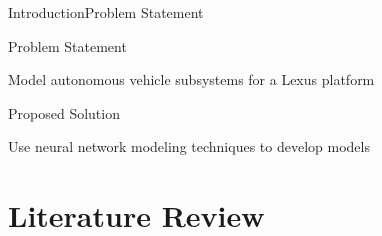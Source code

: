 \documentclass{beamer}
\begin{document}
\begin{frame}{Introduction}{Problem Statement}
  \begin{block}{Problem Statement}
    \begin{Large}
    		Model autonomous vehicle subsystems for a Lexus platform
    \end{Large}
  \end{block}
  \pause
  \begin{block}{Proposed Solution}
    \begin{Large}
    		Use neural network modeling techniques to develop models
    \end{Large}
  \end{block}
\end{frame}




%
%

\section{Literature Review}
\end{document}

